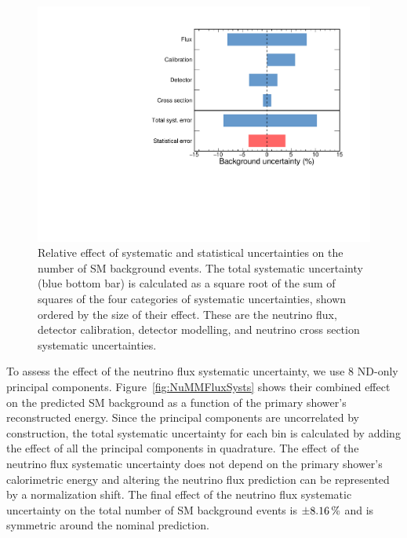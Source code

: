 \begin{figure}[hbtp]
\centering
\includegraphics[width=.9\textwidth]{Plots/NuMM/RelativeErrorBarChart.pdf}
\caption[Summary of systematic uncertainties]{Relative effect of systematic and statistical uncertainties on the number of \acrshort{SM} background events. The total systematic uncertainty (blue bottom bar) is calculated as a square root of the sum of squares of the four categories of systematic uncertainties, shown ordered by the size of their effect. These are the neutrino flux, detector calibration, detector modelling, and neutrino cross section systematic uncertainties.}
\label{fig:NuMMErrorBarChart}
\end{figure}

To assess the effect of the neutrino flux systematic uncertainty, we use 8 \gls{ND}-only principal components. Figure~\ref{fig:NuMMFluxSysts} shows their combined effect on the predicted \gls{SM} background as a function of the primary shower's reconstructed energy. Since the principal components are uncorrelated by construction, the total systematic uncertainty for each bin is calculated by adding the effect of all the principal components in quadrature. The effect of the neutrino flux systematic uncertainty does not depend on the primary shower's calorimetric energy and altering the neutrino flux prediction can be represented by a normalization shift. The final effect of the neutrino flux systematic uncertainty on the total number of \gls{SM} background events is $\pm\unit[8.16]{\%}$ and is symmetric around the nominal prediction.

